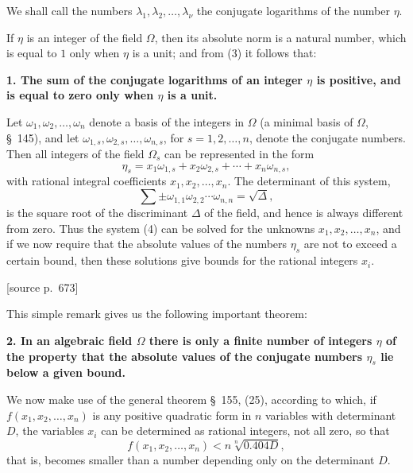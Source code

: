 \documentclass[11pt]{article}
\newcommand{\srcpage}[1]{\par\medskip\noindent\textsf{[source p.~#1]}\par\smallskip}
\begin{document}
We shall call the numbers $\lambda_1,\lambda_2,\ldots,\lambda_\nu$ the conjugate logarithms of the number $\eta$.

If $\eta$ is an integer of the field $\Omega$, then its absolute norm is a natural number, which is equal to $1$ only when $\eta$ is a unit; and from (3) it follows that:

\textbf{1. The sum of the conjugate logarithms of an integer $\eta$ is positive, and is equal to zero only when $\eta$ is a unit.}

Let $\omega_1,\omega_2,\ldots,\omega_n$ denote a basis of the integers in $\Omega$ (a minimal basis of $\Omega$, \S~145), and let $\omega_{1,s},\omega_{2,s},\ldots,\omega_{n,s}$, for $s=1,2,\ldots,n$, denote the conjugate numbers. Then all integers of the field $\Omega_s$ can be represented in the form
\begin{equation}
\eta_s=x_1\omega_{1,s}+x_2\omega_{2,s}+\cdots+x_n\omega_{n,s},
\tag{4}
\end{equation}
with rational integral coefficients $x_1,x_2,\ldots,x_n$. The determinant of this system,
\[
\sum \pm \omega_{1,1}\omega_{2,2}\cdots\omega_{n,n}=\sqrt{\Delta},
\]
is the square root of the discriminant $\Delta$ of the field, and hence is always different from zero. Thus the system (4) can be solved for the unknowns $x_1,x_2,\ldots,x_n$, and if we now require that the absolute values of the numbers $\eta_s$ are not to exceed a certain bound, then these solutions give bounds for the rational integers $x_i$.

\srcpage{673}
This simple remark gives us the following important theorem:

\textbf{2. In an algebraic field $\Omega$ there is only a finite number of integers $\eta$ of the property that the absolute values of the conjugate numbers $\eta_s$ lie below a given bound.}

We now make use of the general theorem \S~155, (25), according to which, if $f(x_1,x_2,\ldots,x_n)$ is any positive quadratic form in $n$ variables with determinant $D$, the variables $x_i$ can be determined as rational integers, not all zero, so that
\[
f(x_1,x_2,\ldots,x_n)< n\sqrt[n]{0.404D},
\]
that is, becomes smaller than a number depending only on the determinant $D$.
\end{document}
